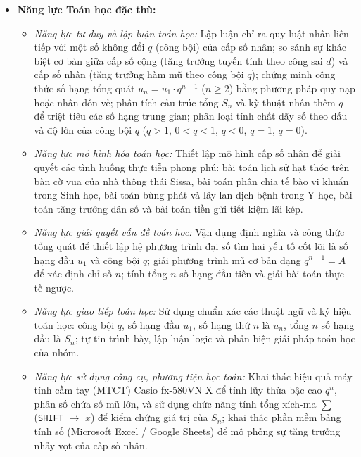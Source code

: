 \documentclass[12pt, a4paper]{article}
\begin{document}
\begin{itemize}[leftmargin=1.2cm]
    \item \textbf{Năng lực Toán học đặc thù:}
    \begin{itemize}[leftmargin=0.6cm]
        \item \textit{Năng lực tư duy và lập luận toán học:} Lập luận chỉ ra quy luật nhân liên tiếp với một số không đổi $q$ (công bội) của cấp số nhân; so sánh sự khác biệt cơ bản giữa cấp số cộng (tăng trưởng tuyến tính theo công sai $d$) và cấp số nhân (tăng trưởng hàm mũ theo công bội $q$); chứng minh công thức số hạng tổng quát $u_n = u_1 \cdot q^{n-1}$ ($n \ge 2$) bằng phương pháp quy nạp hoặc nhân dồn vế; phân tích cấu trúc tổng $S_n$ và kỹ thuật nhân thêm $q$ để triệt tiêu các số hạng trung gian; phân loại tính chất dãy số theo dấu và độ lớn của công bội $q$ ($q > 1$, $0 < q < 1$, $q < 0$, $q = 1$, $q = 0$).
        \item \textit{Năng lực mô hình hóa toán học:} Thiết lập mô hình cấp số nhân để giải quyết các tình huống thực tiễn phong phú: bài toán lịch sử hạt thóc trên bàn cờ vua của nhà thông thái Sissa, bài toán phân chia tế bào vi khuẩn trong Sinh học, bài toán bùng phát và lây lan dịch bệnh trong Y học, bài toán tăng trưởng dân số và bài toán tiền gửi tiết kiệm lãi kép.
        \item \textit{Năng lực giải quyết vấn đề toán học:} Vận dụng định nghĩa và công thức tổng quát để thiết lập hệ phương trình đại số tìm hai yếu tố cốt lõi là số hạng đầu $u_1$ và công bội $q$; giải phương trình mũ cơ bản dạng $q^{n-1} = A$ để xác định chỉ số $n$; tính tổng $n$ số hạng đầu tiên và giải bài toán thực tế ngược.
        \item \textit{Năng lực giao tiếp toán học:} Sử dụng chuẩn xác các thuật ngữ và ký hiệu toán học: công bội $q$, số hạng đầu $u_1$, số hạng thứ $n$ là $u_n$, tổng $n$ số hạng đầu là $S_n$; tự tin trình bày, lập luận logic và phản biện giải pháp toán học của nhóm.
        \item \textit{Năng lực sử dụng công cụ, phương tiện học toán:} Khai thác hiệu quả máy tính cầm tay (MTCT) Casio fx-580VN X để tính lũy thừa bậc cao $q^n$, phân số chứa số mũ lớn, và sử dụng chức năng tính tổng xích-ma $\sum$ (\texttt{SHIFT} $\to$ $x$) để kiểm chứng giá trị của $S_n$; khai thác phần mềm bảng tính số (Microsoft Excel / Google Sheets) để mô phỏng sự tăng trưởng nhảy vọt của cấp số nhân.
    \end{itemize}


\end{itemize}
\end{document}
